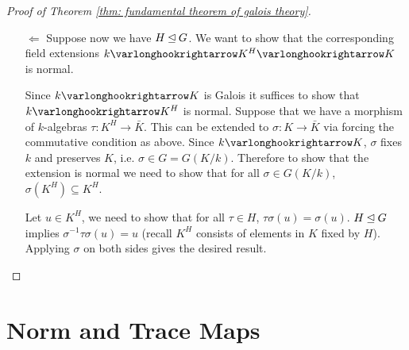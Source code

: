 \begin{proof}[Proof of Theorem \ref{thm: fundamental theorem of galois theory}]
\begin{enumerate}[label=\arabic*)]
\begin{itemize}
            \vspace{1em}
            \begin{minipage}{\linewidth}
                \centering
            \end{minipage}
            \vspace{1em}

            Since the extension $k \ext K$ is also normal, and we have the natural extension $K \ext \bar{L}$ (by Theorem \ref{thm: algebraic extension can be extended to algebraical closure}), apply again \hyperref[def: normal extension]{3) of normal extensions} $\bar{\tau}(K) \subseteq K$, which gives a pre-image for any automorphism in $G(L/k)$. Apply the first isomorphism theorem gives $G/H \simeq G(L/k)$.
            \item[$\Leftarrow$] Suppose now we have $H \unlhd G$. We want to show that the corresponding field extensions $k \ext K^H \ext K$ is normal.
            
            Since $k \ext K$ is Galois it suffices to show that $k \ext K^H$ is normal. Suppose that we have a morphism of $k$-algebras $\tau: K^H \to \bar{K}$. This can be extended to $\sigma: K \to \bar{K}$ via forcing the commutative condition as above. Since $k \ext K$, $\sigma$ fixes $k$ and preserves $K$, i.e. $\sigma \in G = G(K/k)$. Therefore to show that the extension is normal we need to show that for all $\sigma \in G(K/k)$, $\sigma(K^H) \subseteq K^H$. 

            Let $u \in K^H$, we need to show that for all $\tau \in H$, $\tau \sigma(u) = \sigma(u)$. $H \unlhd G$ implies $\sigma^{-1} \tau \sigma(u) = u$ (recall $K^H$ consists of elements in $K$ fixed by $H$). Applying $\sigma$ on both sides gives the desired result. 
        \end{itemize}
    \end{enumerate}
\end{proof}

\section{Norm and Trace Maps}

